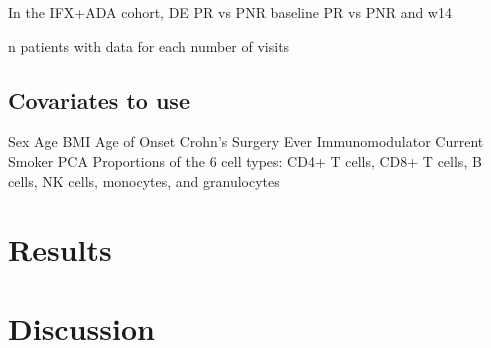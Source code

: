 In the IFX+ADA cohort, 
    DE
    PR vs PNR baseline
    PR vs PNR and w14

n patients with data for each number of visits

\subsection{Covariates to use}

Sex
Age
BMI
Age of Onset
Crohn’s Surgery
Ever Immunomodulator
Current Smoker
PCA
Proportions of the 6 cell types: CD4+ T cells, CD8+ T cells, B cells, NK cells, monocytes, and granulocytes

\section{Results}

\section{Discussion}

